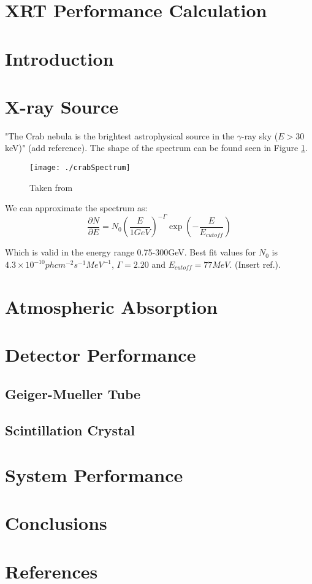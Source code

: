 \documentclass[10pt,a4paper]{article}
\begin{document}
\section*{XRT Performance Calculation}

\section{Introduction}

\section{X-ray Source}

"The Crab nebula is the brightest astrophysical source in the $\gamma$-ray sky ($E > 30$ keV)" (add reference). The shape of the spectrum can be found seen in Figure \ref{fig:crabSpectrum}.

\begin{figure}
\centering
\texttt{[image: ./crabSpectrum]}
\caption[$\gamma$-ray spectrum of Crab nebula]{Taken from}
\label{fig:crabSpectrum}
\end{figure}

We can approximate the spectrum as: \[ \frac{\partial N}{\partial E} = N_{0} \left( \frac{E}{1 GeV} \right) ^{-\Gamma} \exp \left( - \frac{E}{E_{cutoff}} \right) \]

Which is valid in the energy range 0.75-300GeV. Best fit values for $N_{0}$ is $4.3 \times 10^{-10} ph cm^{-2} s^{-1} MeV^{-1}$, $\Gamma = 2.20$ and $E_{cutoff} = 77 MeV$. (Insert ref.). 

\section{Atmospheric Absorption}

\section{Detector Performance}
\subsection{Geiger-Mueller Tube}
\subsection{Scintillation Crystal}

\section{System Performance}

\section{Conclusions}

\section{References}
\end{document}
